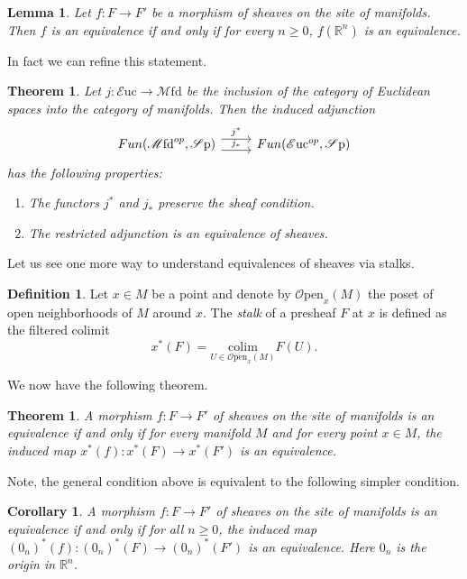 \documentclass[10pt]{amsart}
\newcommand{\bR}{\mathbb{R}}
\newcommand{\Sp}{\mathscr{S}\mathrm{p}}
\newcommand{\colim}{\mathrm{colim}}
\newcommand{\Euc}{\mathscr{E}\mathrm{uc}}
\newcommand{\Mfd}{\mathscr{M}\mathrm{fd}}
\newcommand{\Open}{\mathscr{O}\mathrm{pen}}
\newtheorem{theorem}[equation]{Theorem}
\newtheorem{lemma}[equation]{Lemma}
\newtheorem{corollary}[equation]{Corollary}
\theoremstyle{definition}
\newtheorem{definition}[equation]{Definition}
\theoremstyle{remark}
\begin{document}
\begin{lemma}
 Let $f \colon F \to F'$ be a morphism of sheaves on the site of manifolds. Then $f$ is an equivalence if and only if for every $n \geq 0$, $f(\bR^n)$ is an equivalence.
\end{lemma}

In fact we can refine this statement.

\begin{theorem}
Let $j \colon \Euc \to \Mfd$ be the inclusion of the category of Euclidean spaces into the category of manifolds. Then the induced adjunction 
\[
  \begin{tikzcd}
   Fun(\Mfd^{op},\Sp)  \arrow[r,"j^*", shift left = 1.8] \arrow[r, "j_*", shift right = 1.8]  & Fun(\Euc^{op},\Sp) 
  \end{tikzcd}
\]
has the following properties:
\begin{enumerate}
  \item The functors $j^*$ and $j_*$ preserve the sheaf condition.
  \item The restricted adjunction is an equivalence of sheaves.
\end{enumerate}
\end{theorem}

Let us see one more way to understand equivalences of sheaves via stalks.

\begin{definition}
  Let $x \in M$ be a point and denote by $\Open_x(M)$ the poset of open neighborhoods of $M$ around $x$. The \emph{stalk} of a presheaf $F$ at $x$ is defined as the filtered colimit 
  \[x^*(F) = \underset{U \in \Open_x(M)}{\colim} F(U).\]
\end{definition}

We now have the following theorem.

\begin{theorem}
  A morphism $f\colon F \to F'$ of sheaves on the site of manifolds is an equivalence if and only if for every manifold $M$ and for every point $x \in M$, the induced map $x^*(f) \colon x^*(F) \to x^*(F')$ is an equivalence.
\end{theorem}

Note, the general condition above is equivalent to the following simpler condition. 

\begin{corollary}
  A morphism $f\colon F \to F'$ of sheaves on the site of manifolds is an equivalence if and only if for all $n \geq 0$, the induced map $(0_n)^*(f) \colon (0_n)^*(F) \to (0_n)^*(F')$ is an equivalence. Here $0_n$ is the origin in $\bR^n$.
\end{corollary}


{\footnotesize


}
\end{document}
